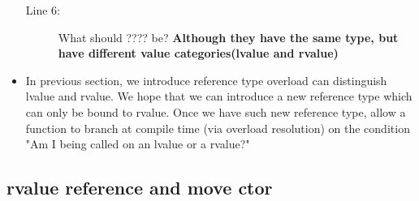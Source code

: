 \documentclass[a4paper,11pt,twoside]{book}
\begin{document}
\begin{itemize}
\begin{description}
	\item [Line 6:]What should ???? be? \textbf{Although they have the same type, but have different value categories(lvalue and rvalue)}
\end{description}

	\item In previous section, we introduce reference type overload can distinguish lvalue and rvalue. We hope that we can introduce a new reference type which can only be bound to rvalue. Once we have such new reference type,  allow a function to branch at compile time (via overload resolution) on the condition "Am I being called on an lvalue or a rvalue?" 
	
\end{itemize}

\subsection{ rvalue reference and move ctor}
\end{document}
